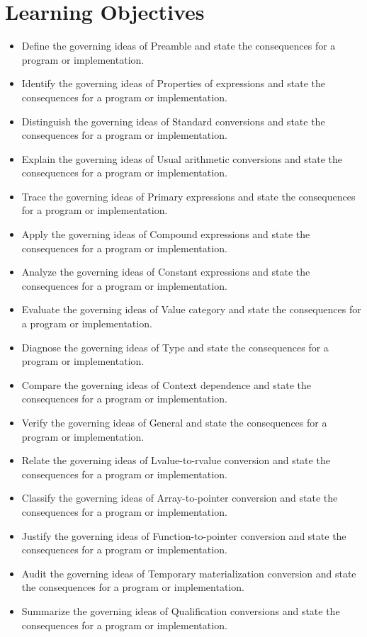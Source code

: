 \documentclass[11pt,letterpaper]{article}
\begin{document}
\section{Learning Objectives}
\begin{itemize}[label=\textcolor{CornellReferenceTeal}{$\blacktriangleright$}]
\item Define the governing ideas of Preamble and state the consequences for a program or implementation.
\item Identify the governing ideas of Properties of expressions and state the consequences for a program or implementation.
\item Distinguish the governing ideas of Standard conversions and state the consequences for a program or implementation.
\item Explain the governing ideas of Usual arithmetic conversions and state the consequences for a program or implementation.
\item Trace the governing ideas of Primary expressions and state the consequences for a program or implementation.
\item Apply the governing ideas of Compound expressions and state the consequences for a program or implementation.
\item Analyze the governing ideas of Constant expressions and state the consequences for a program or implementation.
\item Evaluate the governing ideas of Value category and state the consequences for a program or implementation.
\item Diagnose the governing ideas of Type and state the consequences for a program or implementation.
\item Compare the governing ideas of Context dependence and state the consequences for a program or implementation.
\item Verify the governing ideas of General and state the consequences for a program or implementation.
\item Relate the governing ideas of Lvalue-to-rvalue conversion and state the consequences for a program or implementation.
\item Classify the governing ideas of Array-to-pointer conversion and state the consequences for a program or implementation.
\item Justify the governing ideas of Function-to-pointer conversion and state the consequences for a program or implementation.
\item Audit the governing ideas of Temporary materialization conversion and state the consequences for a program or implementation.
\item Summarize the governing ideas of Qualification conversions and state the consequences for a program or implementation.
\end{itemize}
\end{document}
